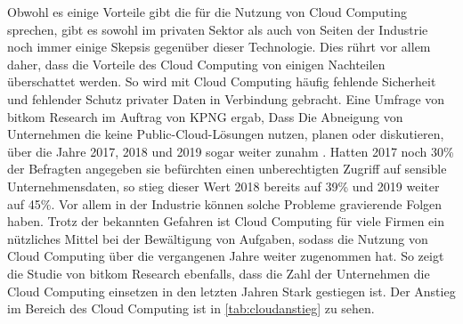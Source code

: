 Obwohl es einige Vorteile gibt die für die Nutzung von Cloud Computing sprechen, gibt es sowohl im privaten Sektor als auch von Seiten der Industrie noch immer einige Skepsis gegenüber dieser Technologie. 
Dies rührt vor allem daher, dass die Vorteile des Cloud Computing von einigen Nachteilen überschattet werden. So wird mit Cloud Computing häufig fehlende Sicherheit und fehlender Schutz privater Daten in Verbindung gebracht. 
Eine Umfrage von bitkom Research im Auftrag von KPNG ergab, Dass Die Abneigung von Unternehmen die keine Public-Cloud-Lösungen nutzen, planen oder diskutieren, über die Jahre 2017, 2018 und 2019 sogar weiter zunahm \cite{heidkamp2020}. Hatten 2017 noch 30\% der Befragten angegeben sie befürchten einen unberechtigten Zugriff auf sensible Unternehmensdaten, so stieg dieser Wert 2018 bereits auf 39\% und 2019 weiter auf 45\%.
Vor allem in der Industrie können solche Probleme gravierende Folgen haben. 
Trotz der bekannten Gefahren ist Cloud Computing für viele Firmen ein nützliches Mittel bei der Bewältigung von Aufgaben, sodass die Nutzung von Cloud Computing über die vergangenen Jahre weiter zugenommen hat.
So zeigt die Studie von bitkom Research ebenfalls, dass die Zahl der Unternehmen die  Cloud Computing einsetzen in den letzten Jahren Stark gestiegen ist. Der Anstieg im Bereich des Cloud Computing ist in \autoref{tab:cloudanstieg} zu sehen.


